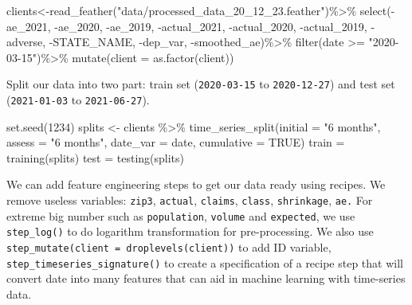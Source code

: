 \documentclass[
]{article}
\newenvironment{Shaded}{\begin{snugshade}}{\end{snugshade}}
\newcommand{\AttributeTok}[1]{\textcolor[rgb]{0.77,0.63,0.00}{#1}}
\newcommand{\ConstantTok}[1]{\textcolor[rgb]{0.00,0.00,0.00}{#1}}
\newcommand{\DecValTok}[1]{\textcolor[rgb]{0.00,0.00,0.81}{#1}}
\newcommand{\FunctionTok}[1]{\textcolor[rgb]{0.00,0.00,0.00}{#1}}
\newcommand{\NormalTok}[1]{#1}
\newcommand{\OtherTok}[1]{\textcolor[rgb]{0.56,0.35,0.01}{#1}}
\newcommand{\SpecialCharTok}[1]{\textcolor[rgb]{0.00,0.00,0.00}{#1}}
\newcommand{\StringTok}[1]{\textcolor[rgb]{0.31,0.60,0.02}{#1}}
\begin{document}
\begin{Shaded}
\begin{Highlighting}[]
\NormalTok{clients}\OtherTok{\textless{}{-}}\FunctionTok{read\_feather}\NormalTok{(}\StringTok{"data/processed\_data\_20\_12\_23.feather"}\NormalTok{)}\SpecialCharTok{\%\textgreater{}\%}
  \FunctionTok{select}\NormalTok{(}\SpecialCharTok{{-}}\NormalTok{ae\_2021, }\SpecialCharTok{{-}}\NormalTok{ae\_2020, }\SpecialCharTok{{-}}\NormalTok{ae\_2019,}
         \SpecialCharTok{{-}}\NormalTok{actual\_2021, }\SpecialCharTok{{-}}\NormalTok{actual\_2020, }\SpecialCharTok{{-}}\NormalTok{actual\_2019, }\SpecialCharTok{{-}}\NormalTok{adverse,}
         \SpecialCharTok{{-}}\NormalTok{STATE\_NAME, }\SpecialCharTok{{-}}\NormalTok{dep\_var, }\SpecialCharTok{{-}}\NormalTok{smoothed\_ae)}\SpecialCharTok{\%\textgreater{}\%}
  \FunctionTok{filter}\NormalTok{(date }\SpecialCharTok{\textgreater{}=} \StringTok{"2020{-}03{-}15"}\NormalTok{)}\SpecialCharTok{\%\textgreater{}\%}
  \FunctionTok{mutate}\NormalTok{(}\AttributeTok{client =} \FunctionTok{as.factor}\NormalTok{(client))}
\end{Highlighting}
\end{Shaded}

Split our data into two part: train set (\texttt{2020-03-15} to
\texttt{2020-12-27}) and test set (\texttt{2021-01-03} to
\texttt{2021-06-27}).

\begin{Shaded}
\begin{Highlighting}[]
  \FunctionTok{set.seed}\NormalTok{(}\DecValTok{1234}\NormalTok{)}
\NormalTok{  splits }\OtherTok{\textless{}{-}}\NormalTok{  clients }\SpecialCharTok{\%\textgreater{}\%}
    \FunctionTok{time\_series\_split}\NormalTok{(}\AttributeTok{initial =} \StringTok{"6 months"}\NormalTok{, }\AttributeTok{assess =} \StringTok{"6 months"}\NormalTok{, }\AttributeTok{date\_var =}\NormalTok{ date, }
        \AttributeTok{cumulative =} \ConstantTok{TRUE}\NormalTok{)}
\NormalTok{  train }\OtherTok{=} \FunctionTok{training}\NormalTok{(splits)}
\NormalTok{  test }\OtherTok{=} \FunctionTok{testing}\NormalTok{(splits)}
\end{Highlighting}
\end{Shaded}

We can add feature engineering steps to get our data ready using
recipes. We remove useless variables: \texttt{zip3}, \texttt{actual},
\texttt{claims}, \texttt{class}, \texttt{shrinkage}, \texttt{ae.} For
extreme big number such as \texttt{population}, \texttt{volume} and
\texttt{expected}, we use \texttt{step\_log()} to do logarithm
transformation for pre-processing. We also use
\texttt{step\_mutate(client\ =\ droplevels(client))} to add ID variable,
\texttt{step\_timeseries\_signature()} to create a specification of a
recipe step that will convert date into many features that can aid in
machine learning with time-series data.
\end{document}
